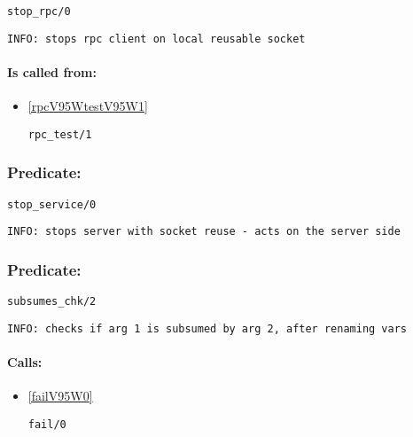 \begin{verbatim}
stop_rpc/0
\end{verbatim}

{\small \begin{verbatim}
INFO: stops rpc client on local reusable socket

\end{verbatim}}
\paragraph{Is called from:} 
\begin{itemize}
\item \ref{rpcV95WtestV95W1} 
\begin{verbatim}
rpc_test/1
\end{verbatim}

\end{itemize}

\subsubsection{Predicate:} \label{stopV95WserviceV95W0}

\begin{verbatim}
stop_service/0
\end{verbatim}

{\small \begin{verbatim}
INFO: stops server with socket reuse - acts on the server side

\end{verbatim}}

\subsubsection{Predicate:} \label{subsumesV95WchkV95W2}

\begin{verbatim}
subsumes_chk/2
\end{verbatim}

{\small \begin{verbatim}
INFO: checks if arg 1 is subsumed by arg 2, after renaming vars

\end{verbatim}}
\paragraph{Calls:} 
\begin{itemize}
\item \ref{failV95W0} 
\begin{verbatim}
fail/0
\end{verbatim}

\end{itemize}
